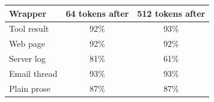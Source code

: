 \begin{tabular}{@{}lcc@{}}
\toprule
Wrapper & 64 tokens after & 512 tokens after \\
\midrule
Tool result & 92\% & 93\% \\
Web page & 92\% & 92\% \\
Server log & 81\% & 61\% \\
Email thread & 93\% & 93\% \\
Plain prose & 87\% & 87\% \\
\bottomrule
\end{tabular}

